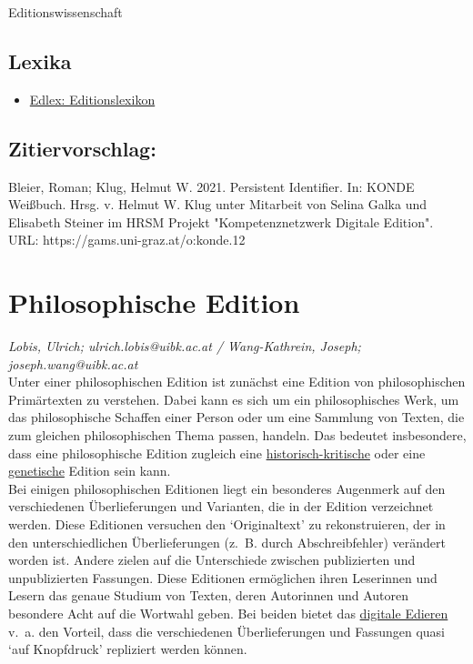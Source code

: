 \documentclass{article}
\begin{document}
Editionswissenschaft\subsection*{Lexika}\begin{itemize}\item \href{https://edlex.de/index.php?title=Persistant_Identifier_(PI)}{Edlex: Editionslexikon}\end{itemize}\subsection*{Zitiervorschlag:}Bleier, Roman; Klug, Helmut W. 2021. Persistent Identifier. In: KONDE Weißbuch. Hrsg. v. Helmut W. Klug unter Mitarbeit von Selina Galka und Elisabeth Steiner im HRSM Projekt "Kompetenznetzwerk Digitale Edition". URL: https://gams.uni-graz.at/o:konde.12\newpage\section*{Philosophische Edition} \emph{Lobis, Ulrich; ulrich.lobis@uibk.ac.at / Wang-Kathrein, Joseph; joseph.wang@uibk.ac.at}\\
        
    Unter einer philosophischen Edition ist zunächst eine Edition von philosophischen Primärtexten zu verstehen. Dabei kann es sich um ein philosophisches Werk, um das philosophische Schaffen einer Person oder um eine Sammlung von Texten, die zum gleichen philosophischen Thema passen, handeln. Das bedeutet insbesondere, dass eine philosophische Edition zugleich eine \href{http://gams.uni-graz.at/o:konde.93}{historisch-kritische} oder eine \href{http://gams.uni-graz.at/o:konde.90}{genetische} Edition sein kann.\\
            
        Bei einigen philosophischen Editionen liegt ein besonderes Augenmerk auf den verschiedenen Überlieferungen und Varianten, die in der Edition verzeichnet werden. Diese Editionen versuchen den ‘Originaltext’ zu rekonstruieren, der in den unterschiedlichen Überlieferungen (z. B. durch Abschreibfehler) verändert worden ist. Andere zielen auf die Unterschiede zwischen publizierten und unpublizierten Fassungen. Diese Editionen ermöglichen ihren Leserinnen und Lesern das genaue Studium von Texten, deren Autorinnen und Autoren besondere Acht auf die Wortwahl geben. Bei beiden bietet das \href{http://gams.uni-graz.at/o:konde.59}{digitale Edieren} v. a. den Vorteil, dass die verschiedenen Überlieferungen und Fassungen quasi ‘auf Knopfdruck’ repliziert werden können.\\
            
\end{document}
